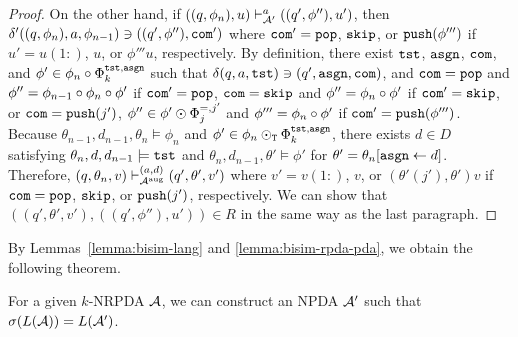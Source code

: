 \begin{proof}
On the other hand,
if $((q,\phi_n),u)\vdash_{{\cal A}'}^a ((q',\phi''),u')$, then
$\delta'((q,\phi_n),a,\allowbreak
\phi_{n-1})\ni ((q',\phi''),\mathtt{com}')$
where
$\mathtt{com}'=\mathtt{pop}$, $\mathtt{skip}$, or $\mathtt{push}(\phi''')$ if
$u'=u(1{:})$, $u$, or $\phi'''u$, respectively.
By definition,
there exist $\mathtt{tst}$, $\mathtt{asgn}$, $\mathtt{com}$, and
$\phi'\in\phi_n\circ\Phi_k^{\mathtt{tst},\mathtt{asgn}}$ such that
$\delta(q,a,\mathtt{tst})\ni(q',\mathtt{asgn},\mathtt{com})$, and
$\mathtt{com}=\mathtt{pop}$ and $\phi''=\phi_{n-1}\circ\phi_n\circ\phi'$
if $\mathtt{com}'=\mathtt{pop}$,
$\mathtt{com}=\mathtt{skip}$ and $\phi''=\phi_n\circ\phi'$ if $\mathtt{com}'=\mathtt{skip}$,
or
$\mathtt{com}=\mathtt{push}(j')$, $\phi''\in\phi'\odot\Phi_j^{=,j'}$
and $\phi'''=\phi_n\circ\phi'$ if $\mathtt{com}'=\mathtt{push}(\phi''')$.
Because $\theta_{n-1},d_{n-1},\theta_n\models\phi_n$ and
$\phi'\in\phi_n\odot_{\mathtt{T}}\Phi_k^{\mathtt{tst},\mathtt{asgn}}$,
there exists $d\in D$ satisfying
$\theta_n,d,d_{n-1}\models\mathtt{tst}$ and
$\theta_n,d_{n-1},\theta'\models\phi'$
for $\theta'=\theta_n[\mathtt{asgn}\gets d]$.
Therefore,
$(q,\theta_n,v)\vdash_{{\cal A}^{\mathrm{aug}}}^{(a,d)} (q',\theta',v')$
where
$v'=v(1{:})$, $v$, or
$(\theta'(j'),\theta')v$
if $\mathtt{com}=\mathtt{pop}$, $\mathtt{skip}$, or $\mathtt{push}(j')$, respectively.
We can show that $((q',\theta',v'),((q',\phi''),u'))\in R$
in the same way as the last paragraph.
\end{proof}

By Lemmas~\ref{lemma:bisim-lang} and \ref{lemma:bisim-rpda-pda},
we obtain the following theorem.
\begin{theorem}
For a given $k$-NRPDA ${\cal A}$, we can construct an NPDA ${\cal A}'$
such that $\sigma(L({\cal A}))=L({\cal A}')$.
\end{theorem}
